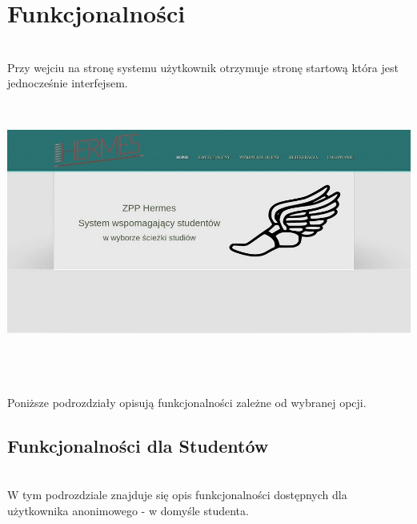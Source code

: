 \documentclass[licencjacka]{pracamgr}
\begin{document}
\chapter{Funkcjonalności}
~\\ \indent
Przy wejciu na stronę systemu użytkownik otrzymuje stronę startową która jest jednocześnie interfejsem. \\ \par
~\\
\begin{minipage}{\linewidth}
	 \centering
           \includegraphics[scale=0.65]{home.jpg}
\end{minipage} \\ \\ \\

 Poniższe podrozdziały opisują funkcjonalności zależne od wybranej opcji.

\section{Funkcjonalności dla Studentów}
~\\ \indent
W tym podrozdziale znajduje się opis funkcjonalności dostępnych dla użytkownika anonimowego - w domyśle studenta.
~\\
\end{document}
